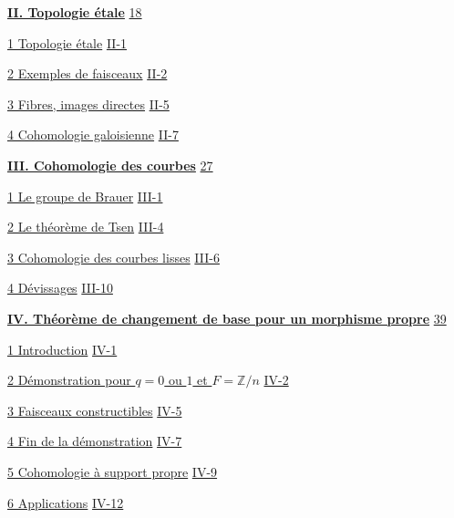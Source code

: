 \documentclass[oneside]{book}
\theoremstyle{sga-source}
\theoremstyle{sga-source-dash}
\theoremstyle{sga-source-dotdash}
\theoremstyle{sga-source-number-note-dash}
\theoremstyle{sga-source-note-number-dotdash}
\theoremstyle{sga-source-example-dotdash}
\theoremstyle{sga-source-inline-number}
\theoremstyle{sga-source-bare-number}
\theoremstyle{sga-source}
\begin{document}
\hyperref[I:2]{\textbf{II. Topologie étale}}\dotfill
  \hyperref[I:2]{18}\par
\hspace*{1.5em}\hyperref[I:2-1]{1 Topologie étale}\dotfill
  \hyperref[I:2-1]{II-1}\par
\hspace*{1.5em}\hyperref[I:2-2]{2 Exemples de faisceaux}\dotfill
  \hyperref[I:2-2]{II-2}\par
\hspace*{1.5em}\hyperref[I:2-3]{3 Fibres, images directes}\dotfill
  \hyperref[I:2-3]{II-5}\par
\hspace*{1.5em}\hyperref[I:2-4]{4 Cohomologie galoisienne}\dotfill
  \hyperref[I:2-4]{II-7}\par

\hyperref[I:3]{\textbf{III. Cohomologie des courbes}}\dotfill
  \hyperref[I:3]{27}\par
\hspace*{1.5em}\hyperref[I:3-1]{1 Le groupe de Brauer}\dotfill
  \hyperref[I:3-1]{III-1}\par
\hspace*{1.5em}\hyperref[I:3-2]{2 Le théorème de Tsen}\dotfill
  \hyperref[I:3-2]{III-4}\par
\hspace*{1.5em}\hyperref[I:3-3]{3 Cohomologie des courbes lisses}\dotfill
  \hyperref[I:3-3]{III-6}\par
\hspace*{1.5em}\hyperref[I:3-4]{4 Dévissages}\dotfill
  \hyperref[I:3-4]{III-10}\par

\hyperref[I:4]{\textbf{IV. Théorème de changement de base pour un morphisme propre}}\dotfill
  \hyperref[I:4]{39}\par
\hspace*{1.5em}\hyperref[I:4-1]{1 Introduction}\dotfill
  \hyperref[I:4-1]{IV-1}\par
\hspace*{1.5em}\hyperref[I:4-2]{2 Démonstration pour $q=0$ ou $1$ et $F=\mathbb Z/n$}\dotfill
  \hyperref[I:4-2]{IV-2}\par
\hspace*{1.5em}\hyperref[I:4-3]{3 Faisceaux constructibles}\dotfill
  \hyperref[I:4-3]{IV-5}\par
\hspace*{1.5em}\hyperref[I:4-4]{4 Fin de la démonstration}\dotfill
  \hyperref[I:4-4]{IV-7}\par
\hspace*{1.5em}\hyperref[I:4-5]{5 Cohomologie à support propre}\dotfill
  \hyperref[I:4-5]{IV-9}\par
\hspace*{1.5em}\hyperref[I:4-6]{6 Applications}\dotfill
  \hyperref[I:4-6]{IV-12}\par
\end{document}
